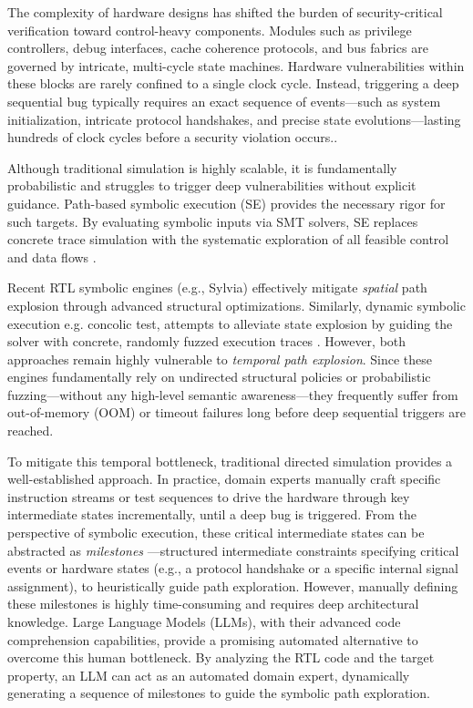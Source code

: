 \documentclass[conference]{IEEEtran}
\begin{document}
The complexity of hardware designs has shifted the burden of security-critical verification toward control-heavy components. Modules such as privilege controllers, debug interfaces, cache coherence protocols, and bus fabrics are governed by intricate, multi-cycle state machines\cite{chen_challenges_2017}. Hardware vulnerabilities within these blocks are rarely confined to a single clock cycle. Instead, triggering a deep sequential bug typically requires an exact sequence of events—such as system initialization, intricate protocol handshakes, and precise state evolutions—lasting hundreds of clock cycles before a security violation occurs.\cite{farahmandi_system--chip_2020}. 

Although traditional simulation is highly scalable, it is fundamentally probabilistic and struggles to trigger deep vulnerabilities without explicit guidance. Path-based symbolic execution (SE) provides the necessary rigor for such targets. By evaluating symbolic inputs via SMT solvers, SE replaces concrete trace simulation with the systematic exploration of all feasible control and data flows \cite{introduction_1}.

Recent RTL symbolic engines (e.g., Sylvia) effectively mitigate \textit{spatial} path explosion through advanced structural optimizations. Similarly, dynamic symbolic execution e.g. concolic test, attempts to alleviate state explosion by guiding the solver with concrete, randomly fuzzed execution traces \cite{concolic_1}\cite{concolic_2}\cite{concolic_3}\cite{concolic_4}. However, both approaches remain highly vulnerable to \textit{temporal path explosion}. Since these engines fundamentally rely on undirected structural policies or probabilistic fuzzing—without any high-level semantic awareness—they frequently suffer from out-of-memory (OOM) or timeout failures long before deep sequential triggers are reached.

To mitigate this temporal bottleneck, traditional directed simulation provides a well-established approach. In practice, domain experts manually craft specific instruction streams or test sequences to drive the hardware through key intermediate states incrementally, until a deep bug is triggered. From the perspective of symbolic execution, these critical intermediate states can be abstracted as \textit{milestones} —structured intermediate constraints specifying critical events or hardware states (e.g., a protocol handshake or a specific internal signal assignment), to heuristically guide path exploration. However, manually defining these milestones is highly time-consuming and requires deep architectural knowledge. Large Language Models (LLMs), with their advanced code comprehension capabilities, provide a promising automated alternative to overcome this human bottleneck. By analyzing the RTL code and the target property, an LLM can act as an automated domain expert, dynamically generating a sequence of milestones to guide the symbolic path exploration. 
\end{document}
